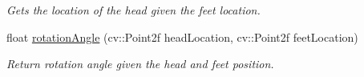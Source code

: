 \begin{DoxyCompactItemize}
\begin{DoxyCompactList}\small\item\em Gets the location of the head given the feet location. \item\end{DoxyCompactList}\item 
\hypertarget{classpeopleDetector_a3eef27a7fee787afb145d9ce497d4015}{
float \hyperlink{classpeopleDetector_a3eef27a7fee787afb145d9ce497d4015}{rotationAngle} (cv::Point2f headLocation, cv::Point2f feetLocation)}
\label{classpeopleDetector_a3eef27a7fee787afb145d9ce497d4015}

\begin{DoxyCompactList}\small\item\em Return rotation angle given the head and feet position. \item\end{DoxyCompactList}\end{DoxyCompactItemize}

